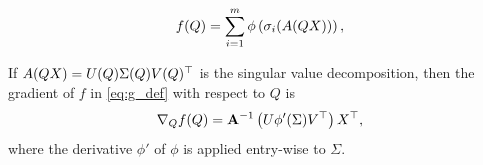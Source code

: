 \documentclass[10pt,a4paper]{amsart}
\newcommand{\bfA}[1]{{\textbf A}(#1)}
\begin{document}
\begin{equation} \label{eq:g_def}
    f(Q) = \sum_{i=1}^m \phi\left(\sigma_i(\bfA{QX})\right),
\end{equation}

\begin{theorem} \label{thm:euclidean_grad} 
    If $\bfA{QX} = U(Q) \Sigma(Q) V(Q)^{\top}$ is the singular value decomposition, then the gradient of $f$ in \eqref{eq:g_def} with respect to $Q$ is 
    \begin{equation} \label{eq:euclidean_grad}
    \nabla_Q f(Q) = {\bf A}^{-1}\left(U\phi'(\Sigma) V^{\top} \right) X^{\top}, 
    \end{equation}
    where the derivative $\phi'$ of $\phi$ is applied entry-wise to $\Sigma$. 
\end{theorem}
\end{document}
